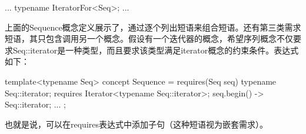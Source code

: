 \begin{cpp}
...
typename IteratorFor<Seq>;
...
\end{cpp}

上面的Sequence概念定义展示了，通过逐个列出短语来组合短语。还有第三类需求短语，其只包含调用另一个概念。假设有一个迭代器的概念，希望序列概念不仅要求Seq::iterator是一种类型，而且要求该类型满足iterator概念的约束条件。表达式如下：

\begin{cpp}
template<typename Seq>
concept Sequence = requires(Seq seq) {
	typename Seq::iterator;
	requires Iterator<typename Seq::iterator>;
	{ seq.begin() } -> Seq::iterator;
	...
};
\end{cpp}

也就是说，可以在requires表达式中添加子句（这种短语视为嵌套需求）。
















